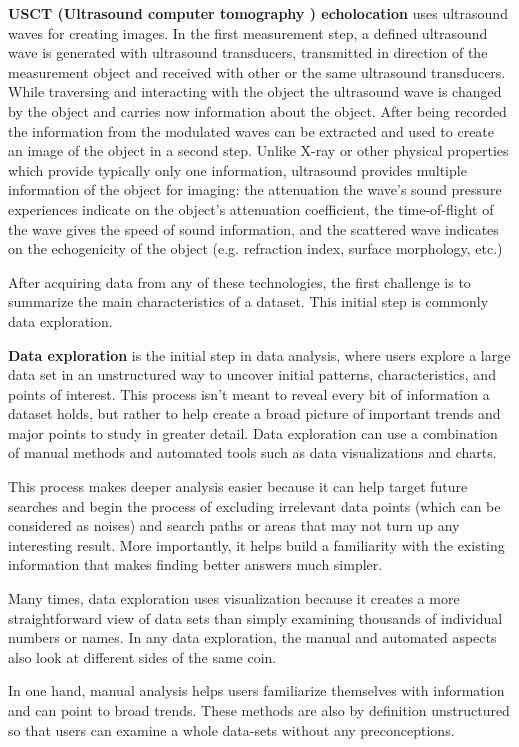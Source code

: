 \textbf{ USCT (Ultrasound computer tomography ) echolocation }  uses ultrasound waves for creating images. In the first measurement step, a defined ultrasound wave is generated with ultrasound transducers, transmitted in direction of the measurement object and received with other or the same ultrasound transducers. While traversing and interacting with the object the ultrasound wave is changed by the object and carries now information about the object. After being recorded the information from the modulated waves can be extracted and used to create an image of the object in a second step. Unlike X-ray or other physical properties which provide typically only one information, ultrasound provides multiple information of the object for imaging: the attenuation the wave's sound pressure experiences indicate on the object's attenuation coefficient, the time-of-flight of the wave gives the speed of sound information, and the scattered wave indicates on the echogenicity of the object (e.g. refraction index, surface morphology, etc.)


After acquiring data from any of these technologies, the first challenge is to summarize the main characteristics of a dataset. This initial step is commonly data exploration.

\textbf{Data exploration} is the initial step in data analysis, where users explore a large data set in an unstructured way to uncover initial patterns, characteristics, and points of interest. This process isn’t meant to reveal every bit of information a dataset holds, but rather to help create a broad picture of important trends and major points to study in greater detail. Data exploration can use a combination of manual methods and automated tools such as data visualizations and charts.

This process makes deeper analysis easier because it can help target future searches and begin the process of excluding irrelevant data points (which can be considered as noises) and search paths or areas that may not turn up any interesting result. More importantly, it helps build a familiarity with the existing information that makes finding better answers much simpler.

Many times, data exploration uses visualization because it creates a more straightforward view of data sets than simply examining thousands of individual numbers or names. In any data exploration, the manual and automated aspects also look at different sides of the same coin.


In one hand, manual analysis helps users familiarize themselves with information and can point to broad trends. These methods are also by definition unstructured so that users can examine a whole data-sets without any preconceptions.

